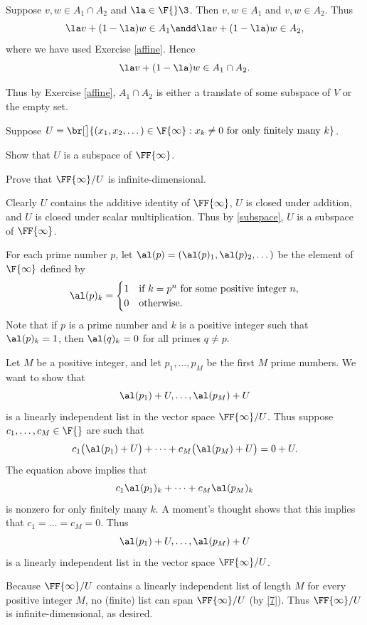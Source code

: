 \begin{Solution}
Suppose $v, w \in A_1 \cap A_2$ and $\la \in \F{}\3$. Then $v, w \in A_1$ and $v, w \in A_2$. Thus
\[
\la v + (1 - \la) w \in A_1 \andd \la v + (1 - \la) w \in A_2,
\]
where we have used Exercise \ref{affine}. Hence
\[
\la v + (1 - \la) w \in A_1 \cap A_2.
\]

Thus by Exercise \ref{affine}, $A_1 \cap A_2$ is either a translate of some subspace of $V$ or the empty set.
\end{Solution}

\exercise
Suppose $U = \br[\big]{(x_1, x_2, \dots) \in \F{\infty}: x_k \ne 0\ \text{for only finitely many}\ k}$.
\begin{subtheorem}
\item
Show that $U$ is a subspace of $\FF{\infty}$.
\item
Prove that $\FF{\infty}/U$ is infinite-dimensional.
\end{subtheorem}
\exercisesubtheoremend

\begin{Solution}
\begin{subtheorem}
\item
Clearly $U$ contains the additive identity of $\FF{\infty}$, $U$ is closed under addition, and $U$ is closed under scalar multiplication. Thus by \ref{subspace}, $U$ is a subspace of $\FF{\infty}$.
\item
For each prime number $p$, let $\al(p) = (\al(p)_1, \al(p)_2, \dots )$ be the element of $\F{\infty}$ defined by
\[
\al(p)_k =
\begin{cases}
1 &\text{if $k = p^n$ for some positive integer $n$,}\\
0 &\text{otherwise.}
\end{cases}
\]
Note that if $p$ is a prime number and $k$ is a positive integer such that $\al(p)_k = 1$, then $\al(q)_k = 0$ for all primes $q \ne p$.

Let $M$ be a positive integer, and let $p_1, \dots, p_M$ be the first $M$ prime numbers. We want to show that
\[
\al(p_1) + U, \dots, \al(p_M) + U
\]
is a linearly independent list in the vector space $\FF{\infty}/U$. Thus suppose $c_1, \dots, c_M \in \F{}$ are such that
\[
c_1\bigl(\al(p_1) + U\bigr) +  \dots + c_M \bigl( \al(p_M) + U\bigr) = 0 + U.
\]
The equation above implies that
\[
c_1 \al(p_1)_k + \dots + c_M \al(p_M)_k
\]
is nonzero for only finitely many $k$. A moment's thought shows that this implies that
$c_1 = \dots = c_M = 0$. Thus
\[
\al(p_1) + U, \dots, \al(p_M) + U
\]
is a linearly independent list in the vector space $\FF{\infty}/U$.

Because $\FF{\infty}/U$ contains a linearly independent list of length $M$ for every positive integer $M$, no (finite) list can span $\FF{\infty}/U$ (by \ref{7}). Thus $\FF{\infty}/U$ is infinite-dimensional, as desired.
\end{subtheorem}
\end{Solution}

